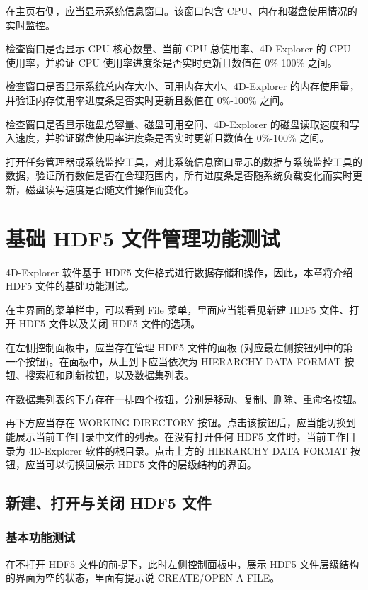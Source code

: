 \documentclass[a4paper,12pt]{report}	%
\begin{document}
在主页右侧，应当显示系统信息窗口。该窗口包含 CPU、内存和磁盘使用情况的实时监控。

检查窗口是否显示 CPU 核心数量、当前 CPU 总使用率、4D-Explorer 的 CPU 使用率，并验证 CPU 使用率进度条是否实时更新且数值在 0\%-100\% 之间。

检查窗口是否显示系统总内存大小、可用内存大小、4D-Explorer 的内存使用量，并验证内存使用率进度条是否实时更新且数值在 0\%-100\% 之间。

检查窗口是否显示磁盘总容量、磁盘可用空间、4D-Explorer 的磁盘读取速度和写入速度，并验证磁盘使用率进度条是否实时更新且数值在 0\%-100\% 之间。

打开任务管理器或系统监控工具，对比系统信息窗口显示的数据与系统监控工具的数据，验证所有数值是否在合理范围内，所有进度条是否随系统负载变化而实时更新，磁盘读写速度是否随文件操作而变化。


\chapter{基础 HDF5 文件管理功能测试}

4D-Explorer 软件基于 HDF5 文件格式进行数据存储和操作，因此，本章将介绍 HDF5 文件的基础功能测试。

在主界面的菜单栏中，可以看到 File 菜单，里面应当能看见新建 HDF5 文件、打开 HDF5 文件以及关闭 HDF5 文件的选项。

在左侧控制面板中，应当存在管理 HDF5 文件的面板 (对应最左侧按钮列中的第一个按钮)。在面板中，从上到下应当依次为 HIERARCHY DATA FORMAT 按钮、搜索框和刷新按钮，以及数据集列表。

在数据集列表的下方存在一排四个按钮，分别是移动、复制、删除、重命名按钮。

再下方应当存在 WORKING DIRECTORY 按钮。点击该按钮后，应当能切换到能展示当前工作目录中文件的列表。在没有打开任何 HDF5 文件时，当前工作目录为 4D-Explorer 软件的根目录。点击上方的 HIERARCHY DATA FORMAT 按钮，应当可以切换回展示 HDF5 文件的层级结构的界面。

\section{新建、打开与关闭 HDF5 文件}

\subsection{基本功能测试}
在不打开 HDF5 文件的前提下，此时左侧控制面板中，展示 HDF5 文件层级结构的界面为空的状态，里面有提示说 CREATE/OPEN A FILE。
\end{document}
